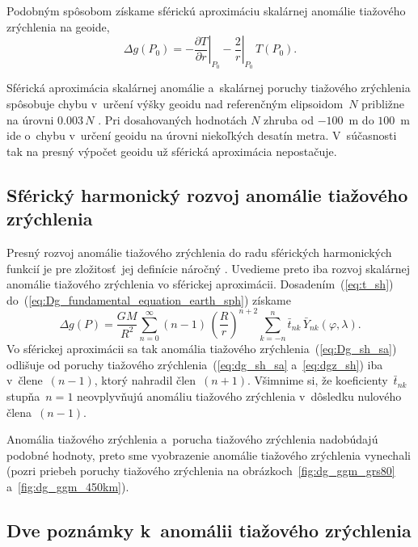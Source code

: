 \documentclass[a4paper, 12pt]{book}
\begin{document}
Podobným spôsobom získame sférickú aproximáciu skalárnej anomálie tiažového 
zrýchlenia na geoide,
%
\begin{equation}
\label{eq:Dg_fundamental_equation_geoid_sph}
\Delta g(P_0) = -\left.\frac{\partial T}{\partial r}\right|_{P_0} 
- \left.\frac{2}{r}\right|_{P_0} \, T(P_0){.}
\end{equation}

Sférická aproximácia skalárnej anomálie a~skalárnej poruchy tiažového 
zrýchlenia spôsobuje chybu v~určení výšky geoidu nad referenčným elipsoidom~$N$ 
približne na úrovni $0.003 \, N$ \parencite{MoritzPhysicalGeodesy}.  Pri 
dosahovaných hodnotách $N$ zhruba od $-100$~m do $100$~m ide o~chybu v~určení 
geoidu na úrovni niekoľkých desatín metra.  V~súčasnosti tak na presný výpočet 
geoidu už sférická aproximácia nepostačuje.


\subsection{Sférický harmonický rozvoj anomálie tiažového zrýchlenia}

Presný rozvoj anomálie tiažového zrýchlenia do radu sférických harmonických 
funkcií je pre zložitosť~jej definície náročný \parencite[pozri 
napríklad][]{Barthelmes2013}.  Uvedieme preto iba rozvoj skalárnej anomálie 
tiažového zrýchlenia vo sférickej aproximácii.  Dosadením~(\ref{eq:t_sh}) 
do~(\ref{eq:Dg_fundamental_equation_earth_sph}) získame
%
\begin{equation}
\label{eq:Dg_sh_sa}
\Delta g(P) = \frac{GM}{R^2} \sum_{n = 0}^\infty (n - 1) \, \left( \frac{R}{r} 
\right)^{n + 2} \sum_{k = -n}^{n} \bar{t}_{nk} \, \bar{Y}_{nk}(\varphi, 
\lambda){.}
\end{equation}
%
Vo sférickej aproximácii sa tak anomália tiažového 
zrýchlenia~(\ref{eq:Dg_sh_sa}) odlišuje od poruchy tiažového 
zrýchlenia~(\ref{eq:dg_sh_sa} a~\ref{eq:dgz_sh}) iba v~člene~$(n - 1)$, ktorý 
nahradil člen~$(n + 1)$.  Všimnime si, že  koeficienty~$\bar{t}_{nk}$ stupňa~$n 
= 1$ neovplyvňujú anomáliu tiažového zrýchlenia v~dôsledku nulového člena~$(n 
- 1)$.

Anomália tiažového zrýchlenia a~porucha tiažového zrýchlenia nadobúdajú podobné 
hodnoty, preto sme vyobrazenie anomálie tiažového zrýchlenia vynechali (pozri 
priebeh poruchy tiažového zrýchlenia na obrázkoch~\ref{fig:dg_ggm_grs80} 
a~\ref{fig:dg_ggm_450km}).



\subsection*{Dve poznámky k~anomálii tiažového zrýchlenia}
\end{document}
